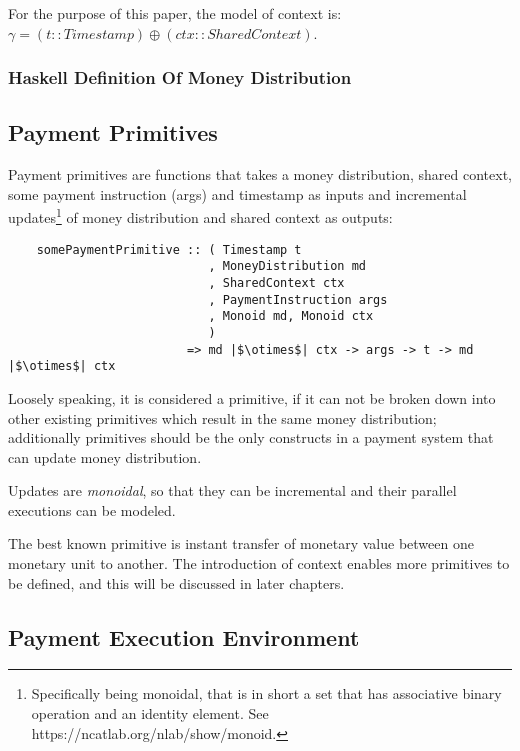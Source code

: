 \documentclass[a4paper,10pt]{report}
\begin{document}
For the purpose of this paper, the model of context is: $\gamma = (t :: Timestamp) \oplus (ctx :: SharedContext)$.

\subsubsection{Haskell Definition Of Money Distribution}




\subsection{Payment Primitives}

Payment primitives are functions that takes a money distribution, shared context, some payment instruction (args) and
timestamp as inputs and incremental updates\footnote{Specifically being monoidal, that is in short a set that has
associative binary operation and an identity element. See https://ncatlab.org/nlab/show/monoid. } of money
distribution and shared context as outputs:

\begin{verbatim}
    somePaymentPrimitive :: ( Timestamp t
                            , MoneyDistribution md
                            , SharedContext ctx
                            , PaymentInstruction args
                            , Monoid md, Monoid ctx
                            )
                         => md |$\otimes$| ctx -> args -> t -> md |$\otimes$| ctx
\end{verbatim}

Loosely speaking, it is considered a primitive, if it can not be broken down into other existing primitives which result
in the same money distribution; additionally primitives should be the only constructs in a payment system that can
update money distribution.

Updates are \textit{monoidal}, so that they can be incremental and their parallel executions can be modeled.

The best known primitive is instant transfer of monetary value between one monetary unit to another. The introduction of
context enables more primitives to be defined, and this will be discussed in later chapters.


\subsection{Payment Execution Environment}
\end{document}
